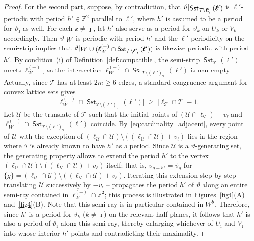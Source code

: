 \documentclass[12pt]{amsart}
\numberwithin{equation}{section}
\DeclareMathOperator{\sst}{\mathsf{Sst}}
\newcommand{\bb}[1]{\mathbb{#1}}
\newcommand{\sob}[1]{\ensuremath{{\mathbin |}\raise-.4ex\hbox{$#1$}}}
\begin{document}
\begin{proof}
For the second part, suppose, by contradiction, that $\vartheta\sob{\sst_{\mathcal{T} \setminus \pmb{\ell}'_{\mathcal{T}}}(\pmb{\ell}')}$ is $\ell'$-periodic with period $h' \in \bb{Z}^2$ parallel to $\pmb{\ell}'$, where $ h' $ is assumed to be a period for $ \vartheta_\jmath $ as well. For each $k \neq \jmath $, let $ h' $ also serve as a period for $\vartheta_k $ on $U_k$ or $V_k$ accordingly. Then $\vartheta\sob{W}$ is periodic with period $h'$ and the $\ell'$-periodicity on the semi-strip implies that $\vartheta\sob{W \cup (\pmb{\ell}_W^{(-)} \cap \sst_{\mathcal{T}\setminus \pmb{\ell}'_{\mathcal{T}}}(\pmb{\ell}'))}$ is likewise periodic with period $h'$. By condition~(i) of Definition~\ref{def:compatible}, the semi-strip $\sst_{\mathcal{T}}(\pmb{\ell}')$ meets $\pmb{\ell}_W^{(-)}$, so the intersection $\pmb{\ell}_W^{(-)} \cap
\sst_{\mathcal{T}\setminus(\pmb{\ell}')_{\mathcal{T}}}(\pmb{\ell}')$ is non-empty. Actually, since $ \mathcal T $ has at least $ 2m \ge 6 $ edges, a standard congruence argument for convex lattice sets gives
\begin{equation}\label{eq:cardinality_adjacent}
  \bigl|\pmb{\ell}_W^{(-)} \cap
  \sst_{\mathcal{T}\setminus(\pmb{\ell}')_{\mathcal{T}}}(\pmb{\ell}')
  \bigr|
  \;\geq\;
  \bigl| \pmb{\ell}_{\mathcal{T}} \cap \mathcal{T}\bigr| - 1.
\end{equation}
Let $\mathcal{U}$ be the translate of $\mathcal{T}$ such that the initial points of $(\mathcal{U} \cap \pmb{\ell}_{\mathcal{U}})+v_{\pmb{\ell}}$ and $\pmb{\ell}_W^{(-)} \cap \sst_{\mathcal{T}\setminus(\pmb{\ell}')_{\mathcal{T}}}(\pmb{\ell}')$ coincide. By~\eqref{eq:cardinality_adjacent}, every point of $ \mathcal{U} $ with the exception of  $(\pmb{\ell}_{\mathcal{U}} \cap \mathcal{U}) \setminus ((\pmb{\ell}_{\mathcal{U}} \cap \mathcal{U}) + v_{\pmb{\ell}})$ lies in the region where $\vartheta$ is already known to have $h'$ as a period. Since $\mathcal{U}$ is a $\vartheta$-generating set, the generating property allows to extend the period $h'$ to the vertex $(\pmb{\ell}_{\mathcal{U}} \cap \mathcal{U}) \setminus ((\pmb{\ell}_{\mathcal{U}} \cap \mathcal{U}) + v_{\pmb{\ell}})$ itself: that is, $\vartheta_{g+h'} = \vartheta_g$ for $ \{g\} =  (\pmb{\ell}_{\mathcal{U}} \cap \mathcal{U}) \setminus ((\pmb{\ell}_{\mathcal{U}} \cap \mathcal{U}) + v_{\pmb{\ell}})$. Iterating this extension step by step -- translating $\mathcal{U}$ successively by $-v_{\pmb{\ell}}$ -- propagates the period $ h' $ of $\vartheta$ along an entire semi-ray contained in $\pmb{\ell}_W^{(-)} \cap \mathbb{Z}^2$; this process is illustrated in Figures~\ref{fig4}{\color{red}(A)} and~\ref{fig4}{\color{red}(B)}. Note that this semi-ray is in particular contained in $ W^b $. Therefore, since $h'$ is a period for $\vartheta_k$ ($k \neq \imath$) on the relevant half-planes, it follows that $h'$ is also a period of $\vartheta_\imath$ along this semi-ray, thereby enlarging whichever of $U_\imath$ and $V_\imath$ into whose interior $h'$ points and contradicting their maximality.


\end{proof}
\end{document}
